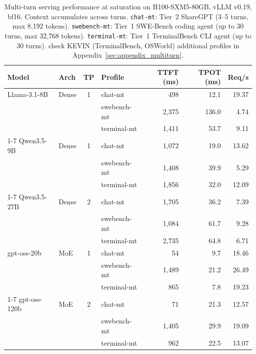 \begin{table}[t]
\caption{Multi-turn serving performance at saturation on H100-SXM5-80GB, vLLM v0.19, bf16. Context accumulates across turns. \texttt{chat-mt}: Tier~2 ShareGPT (3--5 turns, max 8{,}192 tokens). \texttt{swebench-mt}: Tier~1 SWE-Bench coding agent (up to 30 turns, max 32{,}768 tokens). \texttt{terminal-mt}: Tier~1 TerminalBench CLI agent (up to 30 turns). check KEVIN (TerminalBench, OSWorld) additional profiles in Appendix~\ref{sec:appendix_multiturn}.}
\label{tab:multi-turn}
\centering
\small
\setlength{\tabcolsep}{4pt}
\begin{tabular}{@{}llc l rr r@{}}
\toprule
\textbf{Model} & \textbf{Arch} & \textbf{TP} & \textbf{Profile} & \textbf{TTFT (ms)} & \textbf{TPOT (ms)} & \textbf{Req/s} \\
\midrule
Llama-3.1-8B  & Dense & 1 & chat-mt    &    498 &  12.1 & 19.37 \\
              &       &   & swebench-mt      &  2{,}375 & 136.0 &  4.74 \\
              &       &   & terminal-mt      &  1{,}411 &  53.7 &  9.11 \\
\cmidrule(lr){1-7}
Qwen3.5-9B   & Dense & 1 & chat-mt    &  1{,}072 &  19.0 & 13.62 \\
              &       &   & swebench-mt      &  1{,}408 &  39.9 &  5.29 \\
              &       &   & terminal-mt      &  1{,}856 &  32.0 & 12.09 \\
\cmidrule(lr){1-7}
Qwen3.5-27B  & Dense & 2 & chat-mt &  1{,}705 &  36.2 &  7.39 \\
              &       &   & swebench-mt   &  1{,}084 &  61.7 &  9.28 \\
              &       &   & terminal-mt   &  2{,}735 &  64.8 &  6.71 \\
\midrule
gpt-oss-20b  & MoE & 1 & chat-mt    &     54 &   9.7 & 18.46 \\
              &     &   & swebench-mt      &  1{,}489 &  21.2 & 26.49 \\
              &     &   & terminal-mt      &    865 &   7.8 & 19.23 \\
\cmidrule(lr){1-7}
gpt-oss-120b & MoE & 2 & chat-mt    &     71 &  21.3 & 12.57 \\
              &     &   & swebench-mt      &  1{,}405 &  29.9 & 19.09 \\
              &     &   & terminal-mt      &    962 &  22.5 & 13.07 \\
\bottomrule
\end{tabular}
\end{table}


